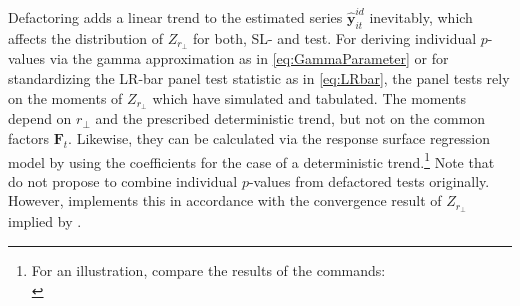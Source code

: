Defactoring adds a linear trend to the estimated series $ \boldsymbol{\hat{y}}^{i \! d}_{it} $ inevitably, which affects the distribution of $ Z_{r_\perp} $ for both, SL- and \citeauthor{Johansen1988} test. For deriving individual $p$-values via the gamma approximation as in \eqref{eq:GammaParameter} or for standardizing the LR-bar panel test statistic as in \eqref{eq:LRbar}, the panel tests rely on the moments of $ Z_{r_\perp} $ which \citet[Appendix, Tab.~A.1]{ArsovaOersal2018} have simulated and tabulated. The moments depend on $ r_\perp $ and the prescribed deterministic trend, but not on the common factors $ \boldsymbol{F}_t $. Likewise, they can be calculated via the response surface regression model by \citet{Trenkler2008} using the coefficients for the case of a deterministic trend.\footnote{For an illustration, compare the results of the  commands:\\ }
Note that \citet{ArsovaOersal2017} do not propose to combine individual $p$-values from defactored \citeauthor{Johansen1988} tests originally. However,  implements this in accordance with the convergence result of $ Z_{r_\perp} $ implied by \citet[p.~1041, Th.~3.4]{ArsovaOersal2018}. 


